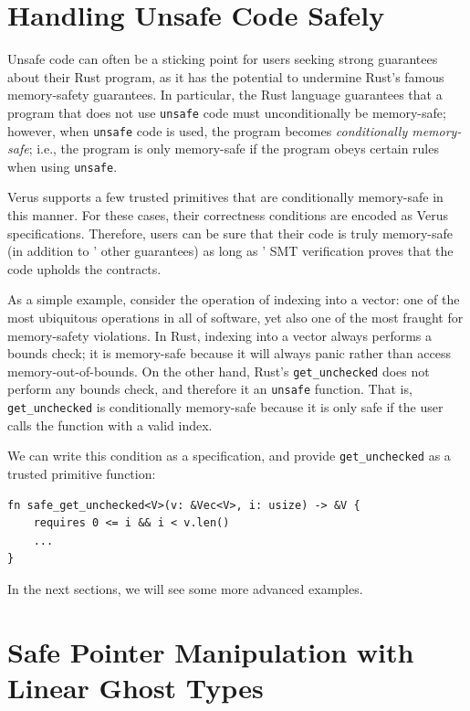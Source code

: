 
\section{Handling Unsafe Code Safely} \label{sec:unsafe}

Unsafe code can often be a sticking point for users seeking strong guarantees about
their Rust program, as it has the potential to undermine Rust's famous memory-safety guarantees.
In particular, the Rust language guarantees that
a program that does not use \texttt{unsafe} code must unconditionally be memory-safe;
however, when \texttt{unsafe} code is used, the program becomes \emph{conditionally memory-safe};
i.e., the program is only memory-safe if the program obeys certain rules when using
\texttt{unsafe}.

Verus supports a few trusted primitives that are conditionally memory-safe in this manner.
For these cases,
their correctness conditions are encoded as Verus specifications.
Therefore, users can be sure that their code is truly memory-safe (in addition to
\verus' other guarantees) as long as \verus' SMT verification proves that the code upholds
the contracts.

As a simple example, consider the operation of indexing into a vector: one of the most ubiquitous
operations in all of software, yet also one of the most fraught for memory-safety violations.
In Rust, indexing into a vector always performs a bounds check; it is memory-safe because
it will always panic rather than access memory-out-of-bounds.
On the other hand, Rust's \verb`get_unchecked` does not perform any bounds check, and
therefore it an \verb`unsafe` function. That is, \verb`get_unchecked` is conditionally
memory-safe because it is only safe if the user calls the function with a valid index.

We can write this condition as a \verus specification, and provide \verb`get_unchecked`
as a trusted primitive function:

\begin{center}
\begin{lstlisting}[language=Verus,style=VerusLineNos]
fn safe_get_unchecked<V>(v: &Vec<V>, i: usize) -> &V {
    requires 0 <= i && i < v.len()
    ...
}
\end{lstlisting}
\end{center}

In the next sections, we will see some more advanced examples.

\section{Safe Pointer Manipulation with Linear Ghost Types} \label{sec:linear-ghost}

